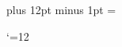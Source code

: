 \def\footnoterule{\kern-3\p@ \hrule height \z@ \kern 3\p@}

\skip\footins=19.5pt plus 12pt minus 1pt
\count{}
\dimen\footins=\maxdimen



\def\landscape{%
  \global\TEMPDIMEN=\PageWidth
  \global\PageWidth=\PageHeight
  \global\PageHeight=\TEMPDIMEN
  \global\let\landscape=\relax%
  \onecolumn
  \message{(landscape)}%
  \raggedbottom
}






\Warn{\start@mess}

\newif\ifCUPmtplainloaded %
\ifprod@font
  \global\CUPmtplainloadedtrue
\fi

\def\mnmacrosloaded{} %

\catcode `\@=12 %


